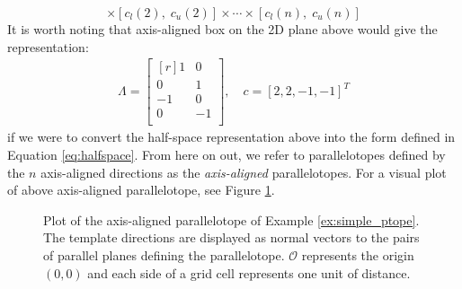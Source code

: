 \begin{example}
\begin{equation}
[c_l(1), \;c_u(1)] \times [c_l(2),\; c_u(2)] \times \cdots \times [c_l(n), \; c_u(n)]
\end{equation}
%
It is worth noting that axis-aligned box on the 2D plane above would give the representation:
\begin{align}
  \Lambda = \begin{bmatrix*}[r]
            1 & 0 \\
            0 & 1 \\
            -1 & 0 \\
            0 & -1 \\
            \end{bmatrix*} , \quad c = [2,2,-1,-1]^T
\end{align}
if we were to convert the half-space representation above into the form defined in Equation \ref{eq:halfspace}.
%
From here on out, we refer to parallelotopes defined by the $n$ axis-aligned directions as the \emph{axis-aligned} parallelotopes.
%
For a visual plot of above axis-aligned parallelotope, see Figure \ref{fig:axis_align_ptope}.

\begin{figure}[h!]
  \centering

  \caption{Plot of the axis-aligned parallelotope of Example \ref{ex:simple_ptope}. The template directions are displayed as normal vectors to the pairs of parallel planes defining the parallelotope. $\mathcal{O}$ represents the origin $(0,0)$ and each side of a grid cell represents one unit of distance.}
  \label{fig:axis_align_ptope}
\end{figure}

\end{example}


